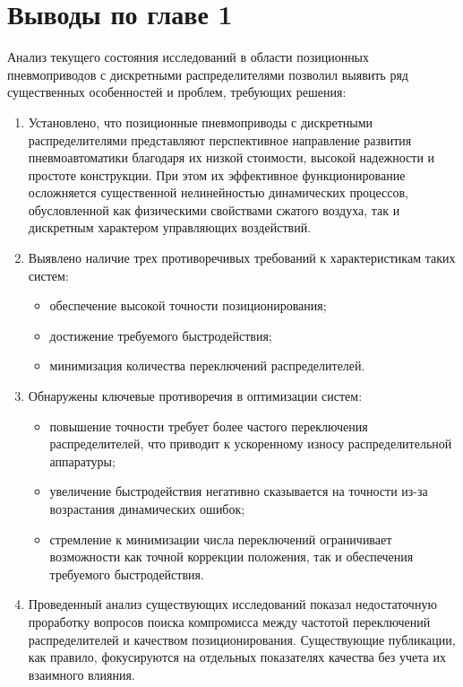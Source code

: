 \section{Выводы по главе 1}\label{sec:ch1/conclusion}

Анализ текущего состояния исследований в области позиционных пневмоприводов с
дискретными распределителями позволил выявить ряд существенных особенностей и проблем, требующих решения:

\begin{enumerate}
	\item Установлено, что позиционные пневмоприводы с дискретными
	      распределителями представляют перспективное направление развития
	      пневмоавтоматики благодаря их низкой стоимости, высокой надежности
	      и простоте конструкции. При этом их эффективное функционирование
	      осложняется существенной нелинейностью динамических процессов,
	      обусловленной как физическими свойствами сжатого воздуха, так и
	      дискретным характером управляющих воздействий.

	\item Выявлено наличие трех противоречивых требований к характеристикам таких систем:
	      \begin{itemize}
		      \item обеспечение высокой точности позиционирования;
		      \item достижение требуемого быстродействия;
		      \item минимизация количества переключений распределителей.
	      \end{itemize}

	\item Обнаружены ключевые противоречия в оптимизации систем:
	      \begin{itemize}
		      \item повышение точности требует более частого переключения
		            распределителей, что приводит к ускоренному износу распределительной аппаратуры;
		      \item увеличение быстродействия негативно сказывается на
		            точности из-за возрастания динамических ошибок;
		      \item стремление к минимизации числа переключений
		            ограничивает возможности как точной коррекции положения, так и обеспечения требуемого быстродействия.
	      \end{itemize}

	\item Проведенный анализ существующих исследований показал
	      недостаточную проработку вопросов поиска компромисса между
	      частотой переключений распределителей и качеством позиционирования.
	      Существующие публикации, как правило, фокусируются на отдельных показателях качества без учета их взаимного влияния.


\end{enumerate}
